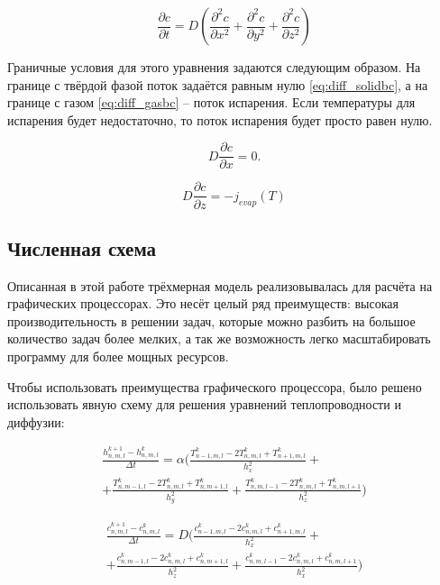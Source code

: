 \begin{equation}
    \label{eq:diffusion}
    \frac{\partial c}{\partial t} = D\left(\frac{\partial^2 c}{\partial x^2} + \frac{\partial^2 c}{\partial y^2} + \frac{\partial^2 c}{\partial z^2}\right)
\end{equation}

Граничные условия для этого уравнения задаются следующим образом. На границе с твёрдой фазой поток задаётся равным нулю \ref{eq:diff_solidbc}, а на границе с газом \ref{eq:diff_gasbc} -- поток испарения. Если температуры для испарения будет недостаточно, то поток испарения будет просто равен нулю.

\begin{equation}
    \label{eq:diff_solidbc}
    D \frac{\partial c}{\partial x} = 0.
\end{equation}

\begin{equation}
    \label{eq:diff_gasbc}
    D \frac{\partial c}{\partial z} = -j_{evap}(T)
\end{equation}

\subsection{Численная схема}

Описанная в этой работе трёхмерная модель реализовывалась для расчёта на графических процессорах. Это несёт целый ряд преимуществ: высокая производительность в решении задач, которые можно разбить на большое количество задач более мелких, а так же возможность легко масштабировать программу для более мощных ресурсов.

Чтобы использовать преимущества графического процессора, было решено использовать явную схему для решения уравнений теплопроводности и диффузии:

\begin{multline}
    \label{eq:heat_scheme}
    \frac{h^{k+1}_{n,m,l} - h^{k}_{n,m,l}}{\Delta t} = \alpha \bigl( \frac{T^k_{n-1, m,l} - 2T^k_{n,m,l} + T^k_{n+1,m,l}}{h_x^2} + \\
    + \frac{T^k_{n, m-1,l} - 2T^k_{n,m,l} + T^k_{n,m+1,l}}{h_y^2} + \frac{T^k_{n, m,l-1} - 2T^k_{n,m,l} + T^k_{n,m,l+1}}{h_z^2} \bigr)
\end{multline}

\begin{multline}
    \label{eq:diff_scheme}
    \frac{c^{k+1}_{n,m,l} - c^{k}_{n,m,l}}{\Delta t} = D\bigl( \frac{c^k_{n-1, m,l} - 2c^k_{n,m,l} + c^k_{n+1,m,l}}{h_x^2} + \\
     + \frac{c^k_{n, m-1,l} - 2c^k_{n,m,l} + c^k_{n,m+1,l}}{h_z^2} + \frac{c^k_{n,m,l-1} - 2c^k_{n,m,l} + c^k_{n,m,l+1}}{h_x^2}\bigr)
\end{multline}

